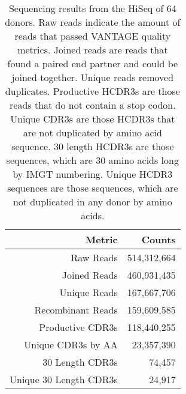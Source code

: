 \begin{table}
\centering
\begin{tabular}{rr}
\toprule
\textbf{Metric}        & \textbf{Counts} \\
\midrule
Raw Reads              & 514,312,664     \\
Joined Reads           & 460,931,435     \\
Unique Reads           & 167,667,706     \\
Recombinant Reads      & 159,609,585     \\
Productive CDR3s       & 118,440,255     \\
Unique CDR3s by AA     & 23,357,390      \\
30 Length CDR3s        & 74,457          \\
Unique 30 Length CDR3s & 24,917         \\
\bottomrule
\end{tabular}
\caption[HiSeq 64-Donor Statistics]{Sequencing results from the HiSeq of 64 donors. Raw reads indicate the amount of reads that passed VANTAGE quality metrics. Joined reads are reads that found a paired end partner and could be joined together. Unique reads removed duplicates. Productive HCDR3s are those reads that do not contain a stop codon. Unique CDR3s are those HCDR3s that are not duplicated by amino acid sequence. 30 length HCDR3s are those sequences, which are 30 amino acids long by IMGT numbering. Unique HCDR3 sequences are those sequences, which are not duplicated in any donor by amino acids.}
\label{tab:table3_2}
\end{table}